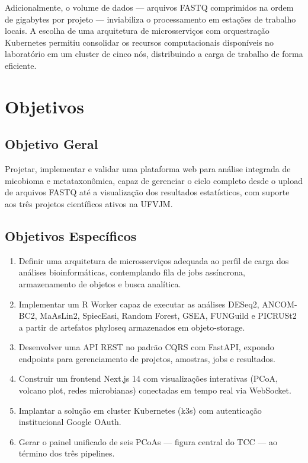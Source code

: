 Adicionalmente, o volume de dados — arquivos FASTQ comprimidos na
ordem de gigabytes por projeto — inviabiliza o processamento em
estações de trabalho locais. A escolha de uma arquitetura de
microsserviços com orquestração Kubernetes permitiu consolidar os
recursos computacionais disponíveis no laboratório em um cluster de
cinco nós, distribuindo a carga de trabalho de forma eficiente.

\section{Objetivos}

\subsection{Objetivo Geral}

Projetar, implementar e validar uma plataforma web para análise
integrada de micobioma e metataxonômica, capaz de gerenciar o ciclo
completo desde o upload de arquivos FASTQ até a visualização dos
resultados estatísticos, com suporte aos três projetos científicos
ativos na UFVJM.

\subsection{Objetivos Específicos}

\begin{enumerate}
  \item Definir uma arquitetura de microsserviços adequada ao perfil
        de carga dos análises bioinformáticas, contemplando fila de
        jobs assíncrona, armazenamento de objetos e busca analítica.

  \item Implementar um R Worker capaz de executar as análises
        DESeq2, ANCOM-BC2, MaAsLin2, SpiecEasi, Random Forest, GSEA,
        FUNGuild e PICRUSt2 a partir de artefatos phyloseq armazenados
        em objeto-storage.

  \item Desenvolver uma API REST no padrão CQRS com FastAPI, expondo
        endpoints para gerenciamento de projetos, amostras, jobs e
        resultados.

  \item Construir um frontend Next.js 14 com visualizações interativas
        (PCoA, volcano plot, redes microbianas) conectadas em tempo
        real via WebSocket.

  \item Implantar a solução em cluster Kubernetes (k3s) com
        autenticação institucional Google OAuth.

  \item Gerar o painel unificado de seis PCoAs — figura central do
        TCC — ao término dos três pipelines.
\end{enumerate}

